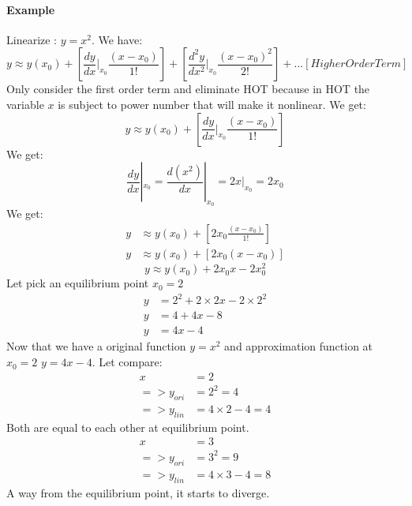\paragraph{Example} Linearize : \(y = x^2\).
We have:
\[
y \approx y(x_0) + \left[\frac{dy}{dx}|_{x_0}\frac{(x-x_0)}{1!}\right] + \left[\frac{d^2y}{dx^2}|_{x_0}\frac{(x-x_0)^2}{2!}\right] + ... [Higher Order Term]
\]
Only consider the first order term and eliminate HOT because in HOT the variable \(x\) is subject to power number that will make it nonlinear. We get:
\[
y \approx y(x_0) + \left[\frac{dy}{dx}|_{x_0}\frac{(x-x_0)}{1!}\right]
\]
We get:
\[
\frac{dy}{dx}|_{x_0} = \frac{d(x^2)}{dx}|_{x_0} = 2x|_{x_0} = 2x_0
\]
We get:
\[
\begin{split}
	y &\approx y(x_0) + \left[2x_0\frac{(x-x_0)}{1!}\right]\\
	y &\approx y(x_0) + \left[2x_0(x-x_0)\right]
\end{split}
\]
\[
\boxed{y \approx y(x_0) + 2x_0x-2x_0^2}
\]
Let pick an equilibrium point \(x_0=2\)
\[
\begin{split}
	y &= 2^2 + 2\times2x-2\times2^2 \\
	y &= 4+4x-8 \\
	y &= 4x-4
\end{split}
\]
Now that we have a original function \(y=x^2\) and approximation function at \(x_0 = 2\) \(y=4x-4\). Let compare:
\[
\begin{split}
	x &= 2 \\
	=>y_{ori} &= 2^2 = 4 \\
	=>y_{lin} &= 4\times2 - 4 = 4
\end{split}
\]
Both are equal to each other at equilibrium point.
\[
\begin{split}
	x &= 3 \\
	=>y_{ori} &= 3^2 = 9 \\
	=>y_{lin} &= 4\times3 - 4 = 8
\end{split}
\]
A way from the equilibrium point, it starts to diverge.